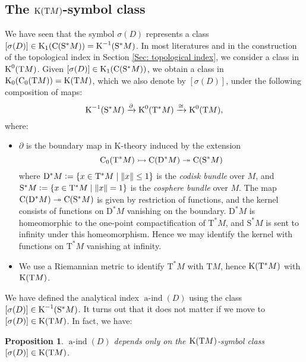 \documentclass[reqno]{scrartcl}
\newtheorem{proposition}[theorem]{Proposition}
\theoremstyle{definition}
\theoremstyle{remark}
\newcommand{\aind}{\operatorname{a-ind}}
\begin{document}
\subsection{The $\operatorname{K}(\mathrm{T}M)$-symbol class}
We have seen that the symbol $\sigma(D)$ represents a class $[\sigma(D)]\in\operatorname{K}_1(\mathrm{C}(\mathrm{S}^*M))=\operatorname{K}^{-1}(\mathrm{S}^*M)$. In most literatures and in the construction of the topological index in Section \ref{Sec: topological index}, we consider a class in $\operatorname{K}^0(\mathrm{T}M)$. Given $[\sigma(D)]\in\operatorname{K}_1(\mathrm{C}(\mathrm{S}^*M))$, we obtain a class in $\operatorname{K}_0(\mathrm{C}_0(\mathrm{T}M))=\operatorname{K}(\mathrm{T}M)$, which we also denote by $[\sigma(D)]$, under the following composition of maps:
\[ \operatorname{K}^{-1}(\mathrm{S}^*M)\xrightarrow{\partial}\operatorname{K}^0(\mathrm{T}^*M)\xrightarrow{\cong}\operatorname{K}^0(\mathrm{T}M), \]
where:
\begin{itemize}
\item $\partial$ is the boundary map in K-theory induced by the extension
\begin{equation} \label{Eqn: disk-sphere extension}
\mathrm{C}_0(\mathrm{T}^*M)\rightarrowtail\mathrm{C}(\mathrm{D}^*M)\twoheadrightarrow\mathrm{C}(\mathrm{S}^*M)
\end{equation}
where $\mathrm{D}^*M\mathrel{\vcentcolon=}\{x\in \mathrm{T}^*M\mid\lVert x\rVert\leq 1\}$ is the \emph{codisk bundle} over $M$, and $\mathrm{S}^*M\mathrel{\vcentcolon=}\{x\in \mathrm{T}^*M\mid\lVert x\rVert=1\}$ is the \emph{cosphere bundle} over $M$. The map $\mathrm{C}(\mathrm{D}^*M)\twoheadrightarrow\mathrm{C}(\mathrm{S}^*M)$ is given by restriction of functions, and the kernel consists of functions on $\mathrm{D}^*M$ vanishing on the boundary. $\mathrm{D}^*M$ is homeomorphic to the one-point compactification of $\mathrm{T}^*M$, and $\mathrm{S}^*M$ is sent to infinity under this homeomorphism. Hence we may identify the kernel with functions on $\mathrm{T}^*M$ vanishing at infinity.
\item We use a Riemannian metric to identify $\mathrm{T}^*M$ with $\mathrm{T}M$, hence $\operatorname{K}(\mathrm{T}^*M)$ with $\operatorname{K}(\mathrm{T}M)$.
\end{itemize}

We have defined the analytical index $\aind(D)$ using the class $[\sigma(D)]\in\operatorname{K}^{-1}(\mathrm{S}^*M)$. It turns out that it does not matter if we move to $[\sigma(D)]\in\operatorname{K}(\mathrm{T}M)$. In fact, we have:
\begin{proposition}
$\aind(D)$ depends only on the $\operatorname{K}(\mathrm{T}M)$-symbol class $[\sigma(D)]\in\operatorname{K}(\mathrm{T}M)$.
\end{proposition}
\end{document}
